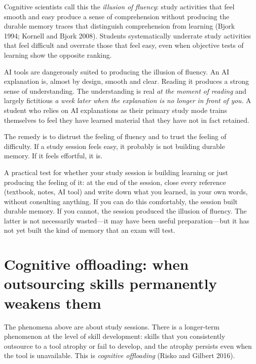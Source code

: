 \documentclass[11pt]{book}
\begin{document}
Cognitive scientists call this the \emph{illusion of fluency}: study activities that feel smooth and easy produce a sense of comprehension without producing the durable memory traces that distinguish comprehension from learning (Bjork 1994; Kornell and Bjork 2008). Students systematically underrate study activities that feel difficult and overrate those that feel easy, even when objective tests of learning show the opposite ranking.

AI tools are dangerously suited to producing the illusion of fluency. An AI explanation is, almost by design, smooth and clear. Reading it produces a strong sense of understanding. The understanding is real \emph{at the moment of reading} and largely fictitious \emph{a week later when the explanation is no longer in front of you.} A student who relies on AI explanations as their primary study mode trains themselves to feel they have learned material that they have not in fact retained.

The remedy is to distrust the feeling of fluency and to trust the feeling of difficulty. If a study session feels easy, it probably is not building durable memory. If it feels effortful, it is.

\begin{tryit}
A practical test for whether your study session is building learning or just producing the feeling of it: at the end of the session, close every reference (textbook, notes, AI tool) and write down what you learned, in your own words, without consulting anything. If you can do this comfortably, the session built durable memory. If you cannot, the session produced the illusion of fluency. The latter is not necessarily wasted---it may have been useful preparation---but it has not yet built the kind of memory that an exam will test.
\end{tryit}

\section{Cognitive offloading: when outsourcing skills permanently weakens them}

The phenomena above are about study sessions. There is a longer-term phenomenon at the level of skill development: skills that you consistently outsource to a tool atrophy or fail to develop, and the atrophy persists even when the tool is unavailable. This is \emph{cognitive offloading} (Risko and Gilbert 2016).
\end{document}
